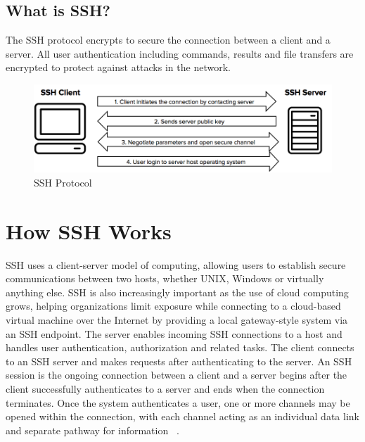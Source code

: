 \subsection{What is SSH?}
The SSH protocol encrypts to secure the connection between a
client and a server. All user authentication including commands,
results and file transfers are encrypted to protect against attacks
in the network.

\begin{figure}[!ht]
        \centering\includegraphics[width=\columnwidth]
        {image/ssh-protocal.png}
        \caption{SSH Protocol~\cite{hid-sp18-513-sshkeyinc}}\label{fig:figure1}
\end{figure}

\section{How SSH Works}
SSH uses a client-server model of computing, allowing users to establish
secure communications between two hosts, whether UNIX, Windows
or virtually anything else. SSH is also increasingly important as the use
of cloud computing grows, helping organizations limit exposure while
connecting to a cloud-based virtual machine over the Internet by providing
a local gateway-style system via an SSH endpoint.
The server enables incoming SSH connections to a host and handles user
authentication, authorization and related tasks. The client connects to an
SSH server and makes requests after authenticating to the server. 
An SSH session is the ongoing connection between a client and a server begins
after the client successfully authenticates to a server and ends when the
connection terminates. Once the system authenticates a user, one or more
channels may be opened within the connection, with each channel acting
as an individual data link and separate pathway for information
~\cite{hid-sp18-513-sans}.


